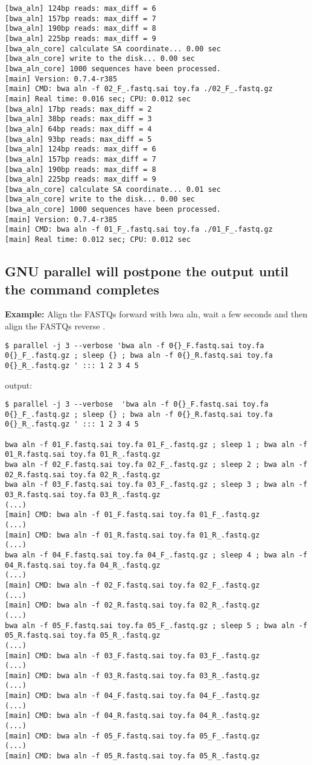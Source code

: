 \documentclass{article}
\newcommand{\example}[1]{
\textbf{Example: } {\color[rgb]{0,0,1} #1 } .
}
\def\prl{\textbf{parallel}}
\begin{document}
\begin{lstlisting}
[bwa_aln] 124bp reads: max_diff = 6
[bwa_aln] 157bp reads: max_diff = 7
[bwa_aln] 190bp reads: max_diff = 8
[bwa_aln] 225bp reads: max_diff = 9
[bwa_aln_core] calculate SA coordinate... 0.00 sec
[bwa_aln_core] write to the disk... 0.00 sec
[bwa_aln_core] 1000 sequences have been processed.
[main] Version: 0.7.4-r385
[main] CMD: bwa aln -f 02_F_.fastq.sai toy.fa ./02_F_.fastq.gz
[main] Real time: 0.016 sec; CPU: 0.012 sec
[bwa_aln] 17bp reads: max_diff = 2
[bwa_aln] 38bp reads: max_diff = 3
[bwa_aln] 64bp reads: max_diff = 4
[bwa_aln] 93bp reads: max_diff = 5
[bwa_aln] 124bp reads: max_diff = 6
[bwa_aln] 157bp reads: max_diff = 7
[bwa_aln] 190bp reads: max_diff = 8
[bwa_aln] 225bp reads: max_diff = 9
[bwa_aln_core] calculate SA coordinate... 0.01 sec
[bwa_aln_core] write to the disk... 0.00 sec
[bwa_aln_core] 1000 sequences have been processed.
[main] Version: 0.7.4-r385
[main] CMD: bwa aln -f 01_F_.fastq.sai toy.fa ./01_F_.fastq.gz
[main] Real time: 0.012 sec; CPU: 0.012 sec
\end{lstlisting}

\subsection{GNU \prl{} will postpone the output until the command completes}
\example{Align the FASTQs forward with bwa aln, wait a few seconds and then align the FASTQs reverse }
\begin{lstlisting}
$ parallel -j 3 --verbose 'bwa aln -f 0{}_F.fastq.sai toy.fa 0{}_F_.fastq.gz ; sleep {} ; bwa aln -f 0{}_R.fastq.sai toy.fa 0{}_R_.fastq.gz ' ::: 1 2 3 4 5
\end{lstlisting}
output:
\begin{lstlisting}
$ parallel -j 3 --verbose  'bwa aln -f 0{}_F.fastq.sai toy.fa 0{}_F_.fastq.gz ; sleep {} ; bwa aln -f 0{}_R.fastq.sai toy.fa 0{}_R_.fastq.gz ' ::: 1 2 3 4 5

bwa aln -f 01_F.fastq.sai toy.fa 01_F_.fastq.gz ; sleep 1 ; bwa aln -f 01_R.fastq.sai toy.fa 01_R_.fastq.gz 
bwa aln -f 02_F.fastq.sai toy.fa 02_F_.fastq.gz ; sleep 2 ; bwa aln -f 02_R.fastq.sai toy.fa 02_R_.fastq.gz 
bwa aln -f 03_F.fastq.sai toy.fa 03_F_.fastq.gz ; sleep 3 ; bwa aln -f 03_R.fastq.sai toy.fa 03_R_.fastq.gz 
(...)
[main] CMD: bwa aln -f 01_F.fastq.sai toy.fa 01_F_.fastq.gz
(...)
[main] CMD: bwa aln -f 01_R.fastq.sai toy.fa 01_R_.fastq.gz
(...)
bwa aln -f 04_F.fastq.sai toy.fa 04_F_.fastq.gz ; sleep 4 ; bwa aln -f 04_R.fastq.sai toy.fa 04_R_.fastq.gz 
(...)
[main] CMD: bwa aln -f 02_F.fastq.sai toy.fa 02_F_.fastq.gz
(...)
[main] CMD: bwa aln -f 02_R.fastq.sai toy.fa 02_R_.fastq.gz
(...)
bwa aln -f 05_F.fastq.sai toy.fa 05_F_.fastq.gz ; sleep 5 ; bwa aln -f 05_R.fastq.sai toy.fa 05_R_.fastq.gz 
(...)
[main] CMD: bwa aln -f 03_F.fastq.sai toy.fa 03_F_.fastq.gz
(...)
[main] CMD: bwa aln -f 03_R.fastq.sai toy.fa 03_R_.fastq.gz
(...)
[main] CMD: bwa aln -f 04_F.fastq.sai toy.fa 04_F_.fastq.gz
(...)
[main] CMD: bwa aln -f 04_R.fastq.sai toy.fa 04_R_.fastq.gz
(...)
[main] CMD: bwa aln -f 05_F.fastq.sai toy.fa 05_F_.fastq.gz
(...)
[main] CMD: bwa aln -f 05_R.fastq.sai toy.fa 05_R_.fastq.gz
\end{lstlisting}
\end{document}
